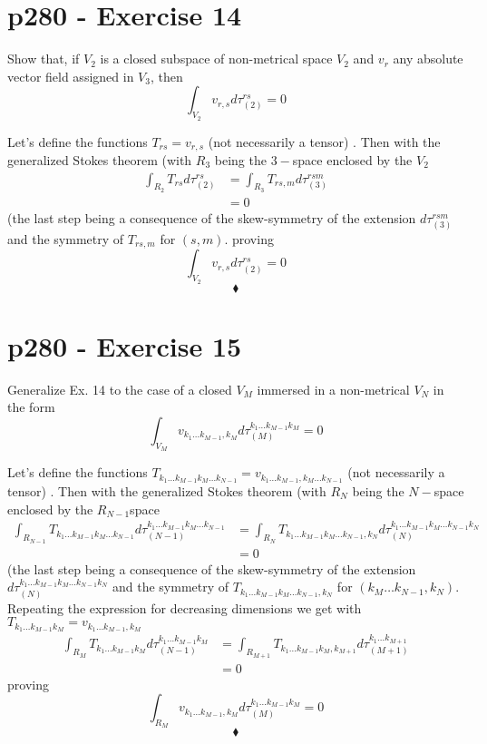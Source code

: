 \section{p280 - Exercise 14}
\begin{tcolorbox}
Show that, if $V_2$ is a closed subspace of non-metrical space $V_2$ and $v_r$ any absolute vector field assigned in $V_3$, then 
$$\int_{V_2} v_{r,s}d\tau_{(2)}^{rs}=0$$
\end{tcolorbox}
Let's define the functions $T_{rs}= v_{r,s}$ (not necessarily a tensor) . Then with the generalized Stokes theorem (with $R_3$ being the $3-$space enclosed  by the $V_2$
\begin{align}
\int_{R_2} T_{rs}d\tau_{(2)}^{rs} &=\int_{R_3} T_{rs,m}d\tau_{(3)}^{rsm}  \\
&=0
\end{align}
(the last step being a consequence of the skew-symmetry of the extension $d\tau_{(3)}^{rsm}$ and the symmetry of $T_{rs,m}$ for $(s,m)$.
proving $$\int_{V_2} v_{r,s}d\tau_{(2)}^{rs}=0$$
$$\blacklozenge$$
\newpage

\section{p280 - Exercise 15}
\begin{tcolorbox}
Generalize Ex. 14 to the case of a closed $V_M$ immersed in a non-metrical $V_N$ in the form  
$$\int_{V_M} v_{k_1\dots k_{M-1},k_M}d\tau_{(M)}^{k_1\dots k_{M-1}k_{M}}=0$$
\end{tcolorbox}
Let's define the functions $T_{k_1\dots k_{M-1}k_M \dots k_{N-1} }= v_{k_1\dots k_{M-1},k_M \dots k_{N-1} }$ (not necessarily a tensor) . Then with the generalized Stokes theorem (with $R_N$ being the $N-$space enclosed  by the $R_{N-1}$space
\begin{align}
\int_{R_{N-1}} T_{k_1\dots k_{M-1}k_M \dots k_{N-1}}d\tau_{(N-1)}^{k_1\dots k_{M-1}k_M \dots k_{N-1}} &=\int_{R_{N}} T_{k_1\dots k_{M-1}k_M \dots k_{N-1},k_N }d\tau_{(N)}^{k_1\dots k_{M-1}k_M \dots k_{N-1}k_N }  \\
&=0
\end{align}
(the last step being a consequence of the skew-symmetry of the extension $d\tau_{(N)}^{k_1\dots k_{M-1}k_M \dots k_{N-1}k_N } $ and the symmetry of $T_{k_1\dots k_{M-1}k_M \dots k_{N-1},k_N }$ for $(k_M \dots k_{N-1},k_N )$.
Repeating the expression for decreasing dimensions we get with 
$T_{k_1\dots k_{M-1}k_M  }= v_{k_1\dots k_{M-1},k_M  }$ 
\begin{align}
\int_{R_{M}} T_{k_1\dots k_{M-1}k_M }d\tau_{(N-1)}^{k_1\dots k_{M-1}k_M } &=\int_{R_{M+1}} T_{k_1\dots k_{M-1}k_M ,k_{M+1} }d\tau_{(M+1)}^{k_1\dots k_{M+1}}  \\
&=0
\end{align}
proving $$\int_{R_{M}}  v_{k_1\dots k_{M-1},k_M  }d\tau_{(M)}^{k_1\dots k_{M-1}k_M }=0$$
$$\blacklozenge$$
\newpage

